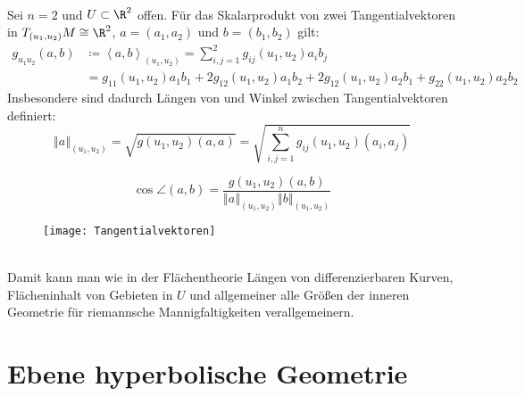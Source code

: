 \begin{remark}
  \  \\
  Sei \( n = 2 \) und \( U \subset \R^2 \) offen. Für das Skalarprodukt von zwei Tangentialvektoren in \( T_{(u_1,u_2)}M \cong \R^2 \), \( a = (a_1, a_2) \) und \( b = (b_1,b_2) \) gilt:
  \begin{align*}
    g_{u_1 u_2}(a,b) &\coloneqq \left\langle a,b \right\rangle_{(u_1, u_2)} = \sum_{i,j = 1}^2 g_{ij}(u_1,u_2)a_i b_j \\
     &= g_{11}(u_1, u_2)a_1 b_1 + 2g_{12}(u_1, u_2)a_1 b_2 + 2g_{12}(u_1, u_2)a_2b_1 + g_{22}(u_1,u_2)a_2 b_2
  \end{align*}
  Insbesondere sind dadurch Längen von und Winkel zwischen Tangentialvektoren definiert:
  \begin{equation*}
    \left\Vert a \right\Vert_{(u_1, u_2)} = \sqrt{g(u_1,u_2)(a,a)} = \sqrt{\sum_{i,j = 1}^n g_{ij}(u_1,u_2)(a_i,a_j)}
  \end{equation*}

  \begin{minipage}{.65\textwidth}
    \begin{equation*}
      \cos \angle (a,b) = \frac{g(u_1,u_2)(a,b)}{\left\Vert a \right\Vert_{(u_1,u_2)} \left\Vert b \right\Vert_{(u_1,u_2)}}
    \end{equation*}
  \end{minipage}
  \hfill
  \begin{minipage}{.325\textwidth}
    \begin{figure}[H]
      \texttt{[image: Tangentialvektoren]}
    \end{figure}
  \end{minipage}
  \  \\

  Damit kann man wie in der Flächentheorie Längen von differenzierbaren Kurven, Flächeninhalt von Gebieten in \( U \) und allgemeiner alle Größen der inneren Geometrie für riemannsche Mannigfaltigkeiten verallgemeinern.
\end{remark}

\section{Ebene hyperbolische Geometrie}

